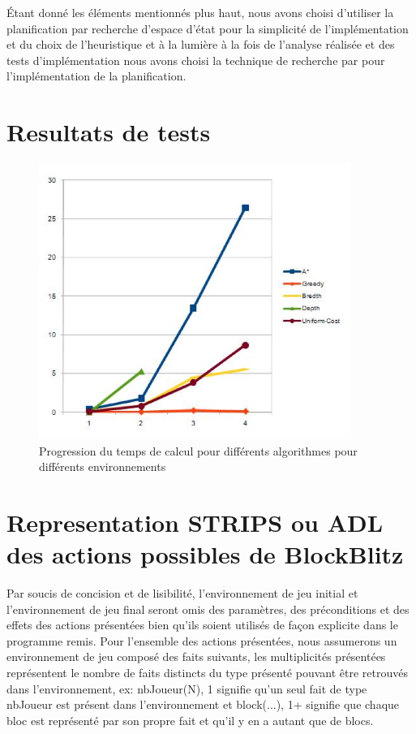 \documentclass[12pt,english,frenchb,letterpaper]{article}
\begin{document}
Étant donné les éléments mentionnés plus haut, nous avons choisi d'utiliser la planification par recherche d'espace d'état pour la simplicité de l'implémentation et du choix de l'heuristique et à la lumière à la fois de l'analyse réalisée et des tests d'implémentation nous avons choisi la technique de recherche par %
pour l'implémentation de la planification.

\section{Resultats de tests}



\begin{figure}[!h] %
\includegraphics[width=4in]{resultats-planif} %
\caption{Progression du temps de calcul pour différents algorithmes pour différents environnements} 
\end{figure}

\section{Representation STRIPS ou ADL des actions possibles de BlockBlitz}
Par soucis de concision et de lisibilité, l'environnement de jeu initial et l'environnement de jeu final seront omis des paramètres, des préconditions et des effets des actions présentées bien qu'ils soient utilisés de fa\c con explicite dans le programme remis.  Pour l'ensemble des actions présentées, nous assumerons un environnement de jeu composé des faits suivants, les multiplicités présentées représentent le nombre de faits distincts du type présenté pouvant être retrouvés dans l'environnement, ex: nbJoueur(N), 1 signifie qu'un seul fait de type nbJoueur est présent dans l'environnement et block(...), 1+ signifie que chaque bloc est représenté par son propre fait et qu'il y en a autant que de blocs.
\end{document}
